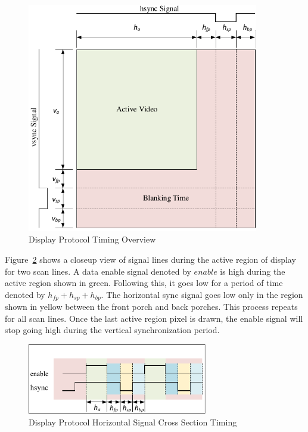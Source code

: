     \begin{figure}
        \centering
        \includegraphics[width=0.9\textwidth]{fig/display_timing_overview.pdf}
        \caption{Display Protocol Timing Overview}
        \label{fig:display_protocol_timing_overview}
    \end{figure}

    Figure~\ref{fig:display_protocol_line_cross} shows a closeup view of signal lines during the active region of display for two scan lines. A data enable signal denoted by $enable$ is high during the active region shown in green. Following this, it goes low for a period of time denoted by $h_{fp}+h_{sp}+h_{bp}$. The horizontal sync signal goes low only in the region shown in yellow between the front porch and back porches. This process repeats for all scan lines. Once the last active region pixel is drawn, the enable signal will stop going high during the vertical synchronization period.

    \begin{figure}
        \centering
        \includegraphics[width=0.7\textwidth]{fig/display_timing_line_cross.pdf}
        \caption{Display Protocol Horizontal Signal Cross Section Timing}
        \label{fig:display_protocol_line_cross}
    \end{figure}

